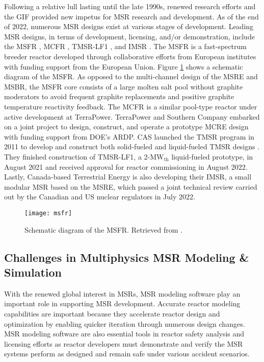 Following a relative lull lasting until the late 1990s, renewed research efforts and the \gls{GIF}
provided new impetus for \gls{MSR} research and development. As of the end of 2022, numerous
\gls{MSR} designs exist at various stages of development. Leading \gls{MSR} designs, in terms of
development, licensing, and/or demonstration, include the \gls{MSFR} \cite{merle_optimized_2007},
\gls{MCFR} \cite{terrapower_terrapower_2021}, TMSR-LF1 \cite{zhang_review_2018}, and \gls{IMSR}
\cite{leblanc_18_2017}. The \gls{MSFR} is a fast-spectrum breeder reactor developed through
collaborative efforts from European institutes with funding support from the
European Union. Figure \ref{fig:msfr} shows a schematic diagram of the \gls{MSFR}. As opposed to
the multi-channel design of the \gls{MSRE} and \gls{MSBR}, the
\gls{MSFR} core consists of a large molten salt pool without graphite moderators to avoid
frequent graphite replacements and positive graphite temperature reactivity feedback. The
\gls{MCFR} is a similar pool-type reactor under active development at TerraPower. TerraPower and
Southern Company embarked on a joint project to design, construct, and operate a prototype
\gls{MCRE} design with funding support from \gls{DOE}'s \gls{ARDP}. \gls{CAS} launched the
\gls{TMSR} program in 2011 to develop and construct both solid-fueled and liquid-fueled \gls{TMSR}
designs \cite{zou_research_2019}. They finished construction of TMSR-LF1, a 2-MW$_{\text{th}}$
liquid-fueled prototype, in August 2021 and received approval for reactor commissioning in August
2022. Lastly, Canada-based Terrestrial Energy is also developing their \gls{IMSR}, a small modular
\gls{MSR} based on the \gls{MSRE}, which passed a joint technical review carried out by the
Canadian and US nuclear regulators in July 2022.
%
\begin{figure}[htb!]
	\centering
	\texttt{[image: msfr]}
	\caption{Schematic diagram of the \gls{MSFR}. Retrieved from 
	\cite{allibert_7_2016}.}
	\label{fig:msfr}
\end{figure}

\subsection{Challenges in Multiphysics \gls{MSR} Modeling \& Simulation}

With the renewed global interest in \glspl{MSR}, \gls{MSR} modeling software play an important role
in supporting \gls{MSR} development.
Accurate reactor modeling capabilities are important because they
accelerate reactor design and optimization by enabling quicker iteration through numerous design
changes. \gls{MSR} modeling software are also essential tools in reactor safety analysis and
licensing efforts as reactor developers must demonstrate and verify the \gls{MSR} systems perform
as designed and remain safe under various accident scenarios.

